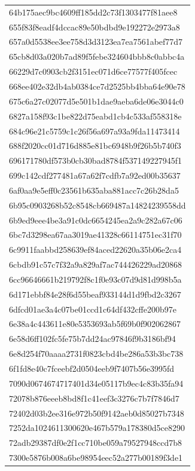 \begin{tabular}{l}
64b175aec9bc4609ff185dd2c73f1303477f81aee8 \\
655f83f8eadf4dccac89e50bdbd9e192272e2973a8 \\
657a0d5538ee3ee758d3d3123ea7ea7561abef77d7 \\
65cb8d03a020b7ad89f5febe324604bbb8c0abbc4a \\
66229d7c0903cb2f3151ec071d6ce77577f405fcec \\
668ee402e32db4ab0384ce7d2525bb4bba64e90e78 \\
675c6a27c02077d5e501b1dae9aeba6de06e3044c0 \\
6827a158f93c1be822d75eabd1cb4c533af558318e \\
684c96e21c5759c1c26f56a697a93a9fda11473414 \\
688f2020cc01d716d885e81bc6948b9f26b5b740f3 \\
696171780df573b0cb30bad8784f537149227945f1 \\
699c142cdf277481a67a62f7cdfb7a92ed00b35637 \\
6af0aa9e5eff0c23561b635aba881acc7c26b28da5 \\
6b95c0903268b52c8548cb669487a14824239558dd \\
6b9ed9eee4be3a91c0dc6654245ea2a9c282a67c06 \\
6bc7d3298ea67aa3019ae41328c66114751ec31f70 \\
6c9911faabbd258639ef84aced22620a35b06e2ca4 \\
6cbdb91c57c7f32a9a829af7ac744426229ad20868 \\
6cc96646661b219792f8c1f0e93c07d9d81d998b5a \\
6d171ebbf84e28f6d55beaf933144d1d9fbd2c3267 \\
6dfcd01ae3a4c07be01ccd1c64df432cffe200b97e \\
6e38a4c443611e80e5353693ab5f69b0f902062867 \\
6e58d6ff102fc5fe75b7dd24ac97846f9b3186bf94 \\
6e8d254f70aaaa2731f0823cbd4be286a53b3bc738 \\
6f1fd8e40c7fceebf2d0504eeb9f7407b56e3995fd \\
7090d0674674717401d34e05117b9ec4c83b35fa94 \\
72078b876eeeb8bd8f1c41eef3c3276c7b7f7846d7 \\
72402d03b2ee316e972b50f9142aeb0d85027b7348 \\
7252da1024611300620e467b579a178380d5ce8290 \\
72adb29387df0e2f1cc710be059a79527948ccd7b8 \\
7300e5876b008a6be98954eec52a277b00189f3de1 \\

\end{tabular}
